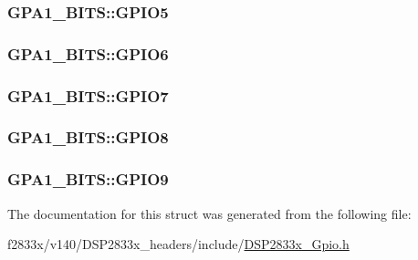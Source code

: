 \subsubsection[{G\+P\+I\+O5}]{ G\+P\+A1\+\_\+\+B\+I\+T\+S\+::\+G\+P\+I\+O5}\label{struct_g_p_a1___b_i_t_s_a017d53ff1b943ede86bfdd535bb2fbc3}
\hypertarget{struct_g_p_a1___b_i_t_s_ab2d5ab606730a1401600e11eb15b9619}{}
\subsubsection[{G\+P\+I\+O6}]{ G\+P\+A1\+\_\+\+B\+I\+T\+S\+::\+G\+P\+I\+O6}\label{struct_g_p_a1___b_i_t_s_ab2d5ab606730a1401600e11eb15b9619}
\hypertarget{struct_g_p_a1___b_i_t_s_ad3d2fcdf697e1df9c62d1f62ddb23cbd}{}
\subsubsection[{G\+P\+I\+O7}]{ G\+P\+A1\+\_\+\+B\+I\+T\+S\+::\+G\+P\+I\+O7}\label{struct_g_p_a1___b_i_t_s_ad3d2fcdf697e1df9c62d1f62ddb23cbd}
\hypertarget{struct_g_p_a1___b_i_t_s_adba7f5d08867e0325d9a18af346e0842}{}
\subsubsection[{G\+P\+I\+O8}]{ G\+P\+A1\+\_\+\+B\+I\+T\+S\+::\+G\+P\+I\+O8}\label{struct_g_p_a1___b_i_t_s_adba7f5d08867e0325d9a18af346e0842}
\hypertarget{struct_g_p_a1___b_i_t_s_aff2c1b599b48835736926d2c5b1577bf}{}
\subsubsection[{G\+P\+I\+O9}]{ G\+P\+A1\+\_\+\+B\+I\+T\+S\+::\+G\+P\+I\+O9}\label{struct_g_p_a1___b_i_t_s_aff2c1b599b48835736926d2c5b1577bf}


The documentation for this struct was generated from the following file\+:\begin{DoxyCompactItemize}
\item 
f2833x/v140/\+D\+S\+P2833x\+\_\+headers/include/\hyperlink{_d_s_p2833x___gpio_8h}{D\+S\+P2833x\+\_\+\+Gpio.\+h}\end{DoxyCompactItemize}
